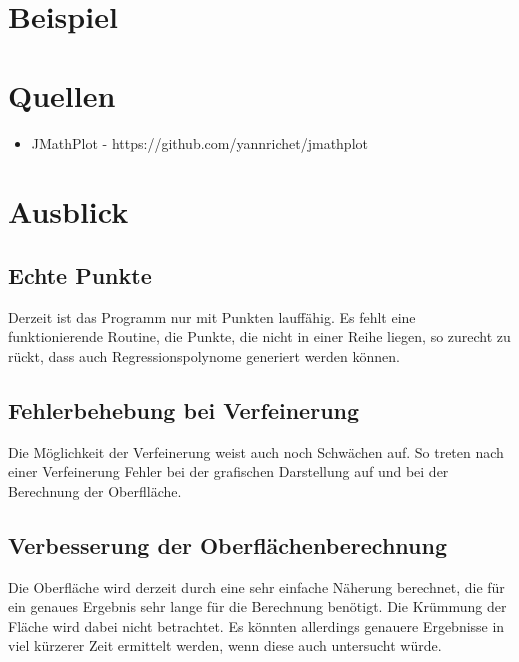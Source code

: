 \documentclass[11pt, bibliography=totocnumbered]{scrartcl}
\begin{document}
\section{Beispiel}

\section{Quellen}
\begin{itemize}
\item JMathPlot - https://github.com/yannrichet/jmathplot
\end{itemize}

\section{Ausblick}
\subsection{Echte Punkte}
Derzeit ist das Programm nur mit  Punkten lauff\"ahig. Es fehlt eine funktionierende Routine, die Punkte, die nicht in einer Reihe liegen, so zurecht zu r\"uckt, dass auch Regressionspolynome generiert werden k\"onnen.
\subsection{Fehlerbehebung bei Verfeinerung}
Die M\"oglichkeit der Verfeinerung weist auch noch Schw\"achen auf. So treten nach einer Verfeinerung Fehler bei der grafischen Darstellung auf und bei der Berechnung der Oberfll\"ache.
\subsection{Verbesserung der Oberfl\"achenberechnung}
Die Oberfl\"ache wird derzeit durch eine sehr einfache N\"aherung berechnet, die f\"ur ein genaues Ergebnis sehr lange f\"ur die Berechnung ben\"otigt. Die Kr\"ummung der Fl\"ache wird dabei nicht betrachtet. Es k\"onnten allerdings genauere Ergebnisse in viel k\"urzerer Zeit ermittelt werden, wenn diese auch untersucht w\"urde. 
\end{document}
